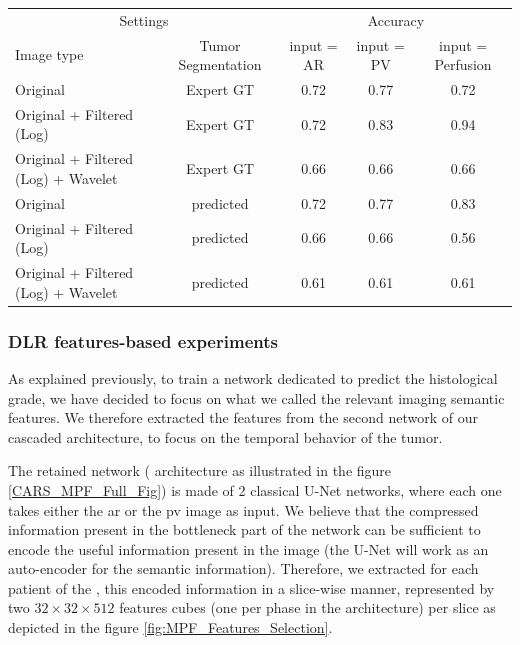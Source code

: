 {\begin{table}[!htp]
\begin{tabular}{lcccc}
\multicolumn{2}{c}{Settings} &\multicolumn{3}{c}{Accuracy} \\\cmidrule{1-5}
Image type &Tumor Segmentation & input = AR &input = PV &input = Perfusion \\\midrule
Original & Expert GT & 0.72 &0.77 &0.72 \\
Original + Filtered (Log) & Expert GT & 0.72 &0.83 &0.94 \\
Original + Filtered (Log) + Wavelet & Expert GT & 0.66 &0.66 &0.66 \\
Original & predicted &0.72 &0.77 &0.83 \\
Original + Filtered (Log) & predicted &0.66 &0.66 &0.56 \\
Original + Filtered (Log) + Wavelet & predicted &0.61 &0.61 &0.61 \\
\bottomrule
\end{tabular}
\end{table}
\renewcommand{\arraystretch}{5}
}

\subsubsection{DLR features-based experiments}

As explained previously, to train a network dedicated to predict the
histological grade, we have decided to focus on what we called the
relevant imaging semantic features.
We therefore extracted the features from the second network of our
cascaded architecture, to focus on the temporal behavior of the tumor.

The retained network ( architecture as illustrated in the figure \ref{CARS_MPF_Full_Fig}) is made of 2 classical U-Net networks, where each
one takes either the \ac{ar} or the \ac{pv} image as input. We believe
that the compressed information present in the bottleneck part of the
network can be sufficient to encode the useful information present in the
image (the U-Net will work as an auto-encoder for the semantic information). Therefore, we extracted for each patient of the \textbf{}, this
encoded information in a slice-wise manner, represented by two $ 32\times32\times512 $
features cubes (one per phase in the  architecture) per slice
as depicted in the figure \ref{fig:MPF_Features_Selection}.


